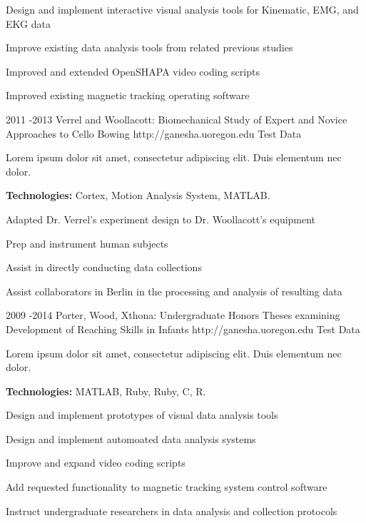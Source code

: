 \documentclass[10pt]{article} %
\begin{document}
\begin{itemize-noindent}
\item{Design and implement interactive visual analysis tools for Kinematic, EMG, and EKG data}
\item{Improve existing data analysis tools from related previous studies}
\item{Improved and extended OpenSHAPA video coding scripts}
\item{Improved existing magnetic tracking operating software}
\end{itemize-noindent}


\job
{2011 -}{2013}
{Verrel and Woollacott: Biomechanical Study of Expert and Novice Approaches to Cello Bowing}
{http://ganesha.uoregon.edu}
{Test Data}
{Lorem ipsum dolor sit amet, consectetur adipiscing elit. Duis elementum nec dolor.\\
\rule{0mm}{5mm}\textbf{Technologies:} Cortex, Motion Analysis System, MATLAB.}

\begin{itemize-noindent}
\item{Adapted Dr. Verrel's experiment design to Dr. Woollacott's equipment}
\item{Prep and instrument human subjects}
\item{Assist in directly conducting data collections}
\item{Assist collaborators in Berlin in the processing and analysis of resulting data}
\end{itemize-noindent}


\job
{2009 -}{2014}
{Porter, Wood, Xthona: Undergraduate Honors Theses examining Development of Reaching Skills in Infants}
{http://ganesha.uoregon.edu}
{Test Data}
{Lorem ipsum dolor sit amet, consectetur adipiscing elit. Duis elementum nec dolor. \\
\rule{0mm}{5mm}\textbf{Technologies:} MATLAB, Ruby, Ruby, C, R.}

\begin{itemize-noindent}
\item{Design and implement prototypes of visual data analysis tools}
\item{Design and implement automoated data analysis systems}
\item{Improve and expand video coding scripts}
\item{Add requested functionality to magnetic tracking system control software}
\item{Instruct undergraduate researchers in data analysis and collection protocols}
\end{itemize-noindent}
\end{document}
